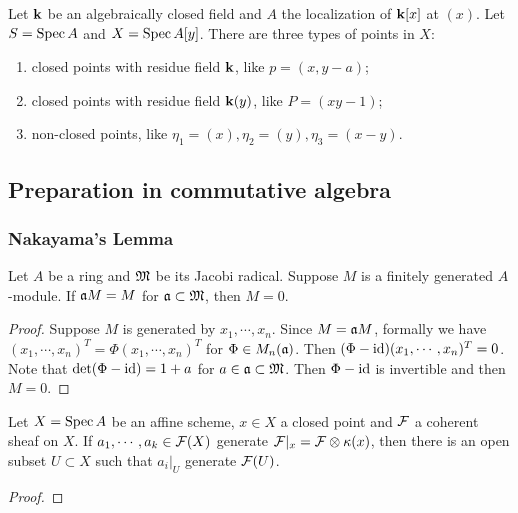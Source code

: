     \begin{example}
        Let ${\mathbf{k}}$ be an algebraically closed field and $A$ the localization of ${\mathbf{k}}[x]$ at $(x)$.
        Let $S = \operatorname{Spec} A$ and $X = \operatorname{Spec} A[y]$. 
        There are three types of points in $X$:
        \begin{enumerate}[label=(\roman*)]
            \item closed points with residue field ${\mathbf{k}}$, like $p = (x,y-a)$;
            \item closed points with residue field ${\mathbf{k}}(y)$, like $P = (xy-1)$;
            \item non-closed points, like $\eta_1 = (x),\eta_2 = (y),\eta_3 = (x-y)$.
        \end{enumerate}

    \end{example}

\subsection{Preparation in commutative algebra}

    \subsubsection{Nakayama's Lemma }

        \begin{theorem}\label{thm: Nakayama's lemma}
            Let $A$ be a ring and ${\mathfrak{M}}$ be its Jacobi radical.
            Suppose $M$ is a finitely generated $A$-module.
            If ${\mathfrak{a}} M = M$ for ${\mathfrak{a}} \subset {\mathfrak{M}}$, then $M = 0$.
        \end{theorem}
        \begin{proof}
            Suppose $M$ is generated by $x_1,\cdots,x_n$.
            Since $M = {\mathfrak{a}} M$, formally we have $(x_1,\cdots,x_n)^T = \Phi (x_1,\cdots, x_n)^T$ for $\Phi \in M_n({\mathfrak{a}})$.
            Then $(\Phi - {\operatorname{id}}) (x_1,\cdots, x_n)^T = 0$. 
            Note that $\det (\Phi - {\operatorname{id}}) = 1+a$ for $a \in {\mathfrak{a}} \subset {\mathfrak{M}}$.
            Then $\Phi-{\operatorname{id}}$ is invertible and then $M=0$.
        \end{proof}

        \begin{proposition}\label{prop: geometric form of Nakayama's lemma}
            Let $X = \operatorname{Spec} A$ be an affine scheme, $x\in X$ a closed point and ${\mathcal{F}}$ a coherent sheaf on $X$.
            If $a_1,\cdots,a_k \in {\mathcal{F}}(X)$ generate ${\mathcal{F}}|_x = {\mathcal{F}} \otimes {\kappa}(x)$, then there is an open subset $U \subset X$ such that $a_i|_U$ generate ${\mathcal{F}}(U)$. 
        \end{proposition}
        \begin{proof}
        \end{proof}

